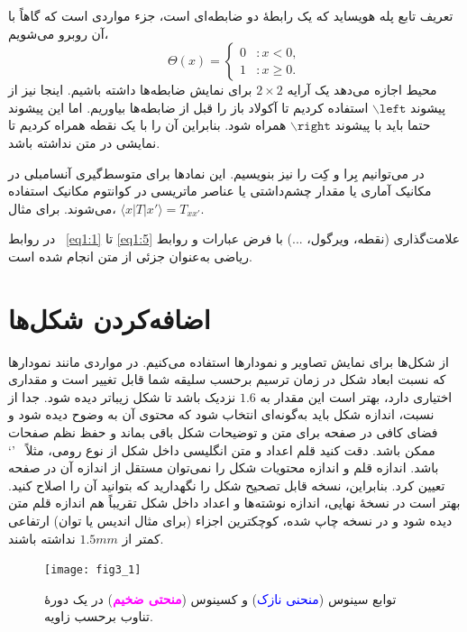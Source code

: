 تعریف تابع پله هویساید%
که یک رابطهٔ دو ضابطه‌ای است، جزء مواردی است که گاهاً با آن روبرو می‌شویم،
\begin{equation}\label{eq1:5}
\Theta(x) = \left\{\begin{array}{ll}
0 & : x < 0,\\
1 & : x \ge 0.
\end{array}\right.
\end{equation}
محیط 
اجازه می‌دهد یک آرایه 
$2\times2$ 
برای نمایش ضابطه‌ها داشته باشیم. اینجا نیز از پیشوند 
$\backslash\texttt{left}$ 
استفاده کردیم تا آکولاد باز را قبل از ضابطه‌ها بیاوریم. اما این پیشوند حتما باید با پیشوند 
$\backslash\texttt{right}$ 
همراه شود. بنابراین آن را با یک نقطه همراه کردیم تا نمایشی در متن نداشته باشد.

در 
\latex 
می‌توانیم بِرا و کِت را نیز بنویسیم. این نمادها برای متوسط‌گیری آنسامبلی در مکانیک آماری یا مقدار چشم‌داشتی یا عناصر ماتریسی در کوانتوم مکانیک استفاده می‌شوند. برای مثال،
$\langle x|T|x' \rangle = T_{xx'}$.

در روابط~%
\eqref{eq1:1} 
تا 
\eqref{eq1:5} 
علامت‌گذاری (نقطه، ویرگول، ...) با فرض عبارات و روابط ریاضی به‌عنوان جزئی از متن انجام شده است.


\section{اضافه‌کردن شکل‌ها}
از شکل‌ها برای نمایش تصاویر و نمودارها استفاده می‌کنیم. در مواردی مانند نمودارها که نسبت ابعاد%
شکل در زمان ترسیم برحسب سلیقه شما قابل تغییر است و مقداری اختیاری دارد، بهتر است این مقدار به $1.6$ نزدیک باشد تا شکل زیباتر دیده شود. جدا از نسبت، اندازه شکل باید به‌گونه‌ای انتخاب شود که محتوی آن به وضوح دیده شود و فضای کافی در صفحه برای متن و توضیحات شکل باقی بماند و حفظ نظم صفحات ممکن باشد. دقت کنید قلم اعداد و متن انگلیسی داخل شکل از نوع رومی، مثلاً~
'` 
باشد. اندازه قلم و اندازه محتویات شکل را نمی‌توان مستقل از اندازه آن در صفحه تعیین کرد. بنابراین، نسخه قابل تصحیح شکل را نگهدارید که بتوانید آن را اصلاح کنید. بهتر است در نسخهٔ نهایی، اندازه نوشته‌ها و اعداد داخل شکل تقریباً هم اندازه قلم متن دیده شود و در نسخه چاپ شده، کوچکترین اجزاء (برای مثال اندیس یا توان) ارتفاعی کمتر از 
$1.5\unit{mm}$ 
نداشته باشند. 

\begin{figure}[!tbhp] %
\centering
\texttt{[image: fig3\_1]}
\caption[ %
توابع سینوس و کسینوس در یک دورهٔ تناوب]{ %
توابع سینوس 
(\textcolor{blue}{منحنی نازک}) 
و کسینوس 
(\textbf{\textcolor{magenta}{منحتی ضخیم}}) 
در یک دورهٔ تناوب برحسب زاویه.}
\label{fig3:1}
\end{figure}


